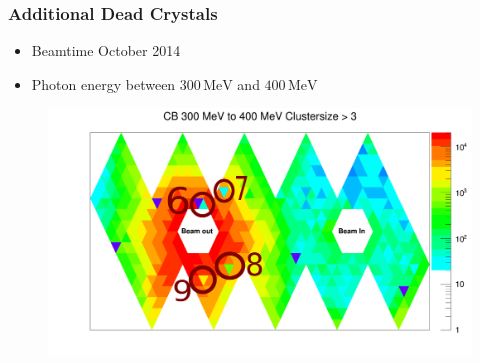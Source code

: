 \documentclass[slidestop,compress,mathserif]{beamer}
\begin{document}
\begin{frame}
	\frametitle{Additional Dead Crystals}
	\begin{itemize}
		\item Beamtime October 2014
		\item Photon energy between $300\,\text{MeV}$ and $400\,\text{MeV}$
	\end{itemize}



	\begin{figure}
		\centering
		\begin{minipage}[t]{.6\textwidth}
			\centering
			\vspace{0pt}
			\includegraphics[width=\textwidth]{Pictures/20172504StrahlzeitMoreDead}
			
		\end{minipage}\hfill
		\begin{minipage}[t]{.4\textwidth}
			\centering
			\vspace{0pt}
			
\end{minipage}
\end{figure}
\end{frame}
\end{document}
